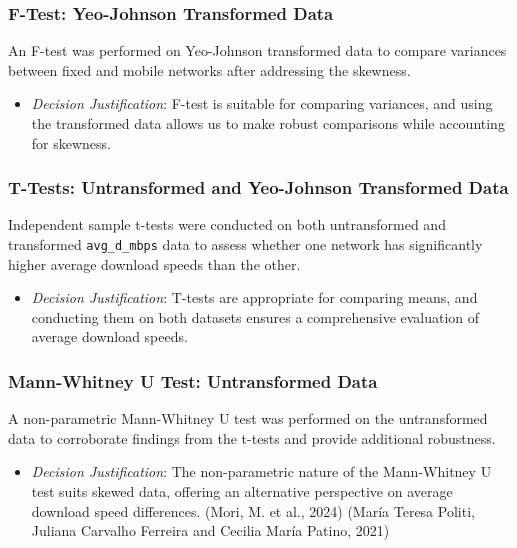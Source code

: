 \documentclass[
  letterpaper,
  DIV=11,
  numbers=noendperiod,
  oneside]{scrartcl}
\providecommand{\tightlist}{%
  \setlength{\itemsep}{0pt}\setlength{\parskip}{0pt}}\usepackage{longtable,booktabs,array}
\begin{document}
\hypertarget{f-test-yeo-johnson-transformed-data}{%
\subsubsection{F-Test: Yeo-Johnson Transformed
Data}\label{f-test-yeo-johnson-transformed-data}}

An F-test was performed on Yeo-Johnson transformed data to compare
variances between fixed and mobile networks after addressing the
skewness.

\begin{itemize}
\tightlist
\item
  \emph{Decision Justification}: F-test is suitable for comparing
  variances, and using the transformed data allows us to make robust
  comparisons while accounting for skewness.
\end{itemize}

\hypertarget{t-tests-untransformed-and-yeo-johnson-transformed-data}{%
\subsubsection{T-Tests: Untransformed and Yeo-Johnson Transformed
Data}\label{t-tests-untransformed-and-yeo-johnson-transformed-data}}

Independent sample t-tests were conducted on both untransformed and
transformed \texttt{avg\_d\_mbps} data to assess whether one network has
significantly higher average download speeds than the other.

\begin{itemize}
\tightlist
\item
  \emph{Decision Justification}: T-tests are appropriate for comparing
  means, and conducting them on both datasets ensures a comprehensive
  evaluation of average download speeds.
\end{itemize}

\hypertarget{mann-whitney-u-test-untransformed-data}{%
\subsubsection{Mann-Whitney U Test: Untransformed
Data}\label{mann-whitney-u-test-untransformed-data}}

A non-parametric Mann-Whitney U test was performed on the untransformed
data to corroborate findings from the t-tests and provide additional
robustness.

\begin{itemize}
\tightlist
\item
  \emph{Decision Justification}: The non-parametric nature of the
  Mann-Whitney U test suits skewed data, offering an alternative
  perspective on average download speed differences. (Mori, M. et al.,
  2024) (María Teresa Politi, Juliana Carvalho Ferreira and Cecilia
  María Patino, 2021)
\end{itemize}
\end{document}
